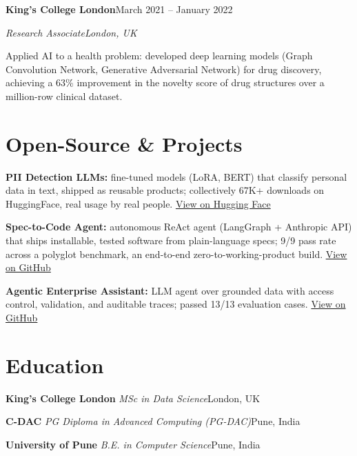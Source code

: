 \documentclass[10pt,a4paper]{article}
\newcommand{\entry}[4]{%
  {\color{company}\bfseries #1}\hfill {\color{muted}#2}\par
  \vspace{1pt}
  {\itshape #3}\hfill {\color{muted}\itshape #4}\par
  \vspace{3pt}%
}
\newcommand{\sep}{\,\textcolor{accent!60}{\textbar}\,}
\begin{document}
\entry{King's College London}{March 2021 -- January 2022}{Research Associate}{London, UK}
\begin{tight}
  \item Applied AI to a health problem: developed deep learning models (Graph Convolution Network, Generative Adversarial Network) for drug discovery, achieving a 63\% improvement in the novelty score of drug structures over a million-row clinical dataset.
\end{tight}

\section{Open-Source \& Projects}
\begin{tight}
  \item \textbf{PII Detection LLMs:} fine-tuned models (LoRA, BERT) that classify personal data in text, shipped as reusable products; collectively 67K+ downloads on HuggingFace, real usage by real people. \href{https://huggingface.co/ab-ai/pii_model}{View on Hugging Face}
  \item \textbf{Spec-to-Code Agent:} autonomous ReAct agent (LangGraph + Anthropic API) that ships installable, tested software from plain-language specs; 9/9 pass rate across a polyglot benchmark, an end-to-end zero-to-working-product build. \href{https://github.com/abhijeetscode/Spec-to-Code-Agent}{View on GitHub}
  \item \textbf{Agentic Enterprise Assistant:} LLM agent over grounded data with access control, validation, and auditable traces; passed 13/13 evaluation cases. \href{https://github.com/abhijeetscode/Agentic-Enterprise-Assistant}{View on GitHub}
\end{tight}

\section{Education}
{\color{company}\bfseries King's College London}\sep{\itshape MSc in Data Science}\hfill {\color{muted}London, UK}\par\vspace{1pt}
{\color{company}\bfseries C-DAC}\sep{\itshape PG Diploma in Advanced Computing (PG-DAC)}\hfill {\color{muted}Pune, India}\par\vspace{1pt}
{\color{company}\bfseries University of Pune}\sep{\itshape B.E. in Computer Science}\hfill {\color{muted}Pune, India}\par
\end{document}
